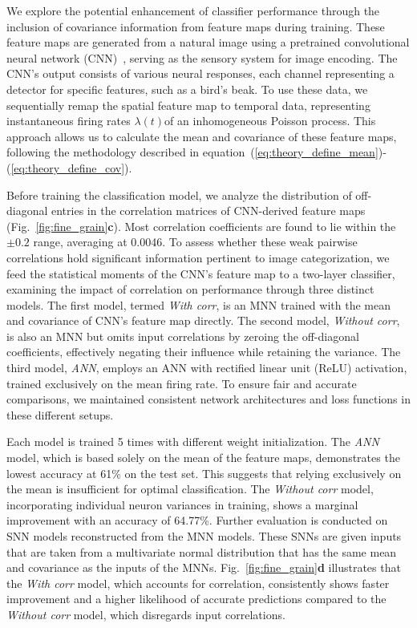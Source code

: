 We explore the potential enhancement of classifier performance through the inclusion of covariance information from feature maps during training. 
These feature maps are generated from a natural image using a pretrained convolutional neural network (CNN)~\cite{simonyan2014very}, serving as the sensory system for image encoding. 
The CNN's output consists of various neural responses, each channel representing a detector for specific features, such as a bird's beak. 
To use these data, we sequentially remap the spatial feature map to temporal data, representing instantaneous firing rates \(\lambda(t)\)of an inhomogeneous Poisson process. 
This approach allows us to calculate the mean and covariance of these feature maps, following the methodology described in equation~(\ref{eq:theory_define_mean})-(\ref{eq:theory_define_cov}). 

Before training the classification model, we analyze the distribution of off-diagonal entries in the correlation matrices of CNN-derived feature maps (Fig.~\ref{fig:fine_grain}\textbf{c}). 
Most correlation coefficients are found to lie within the \(\pm 0.2\) range, averaging at 0.0046. 
To assess whether these weak pairwise correlations hold significant information pertinent to image categorization, we feed the statistical moments of the CNN's feature map to a two-layer classifier, examining the impact of correlation on performance through three distinct models. 
The first model, termed \textit{With corr}, is an MNN trained with the mean and covariance of CNN's feature map directly.
The second model, \textit{Without corr}, is also an MNN but omits input correlations by zeroing the off-diagonal coefficients, effectively negating their influence while retaining the variance. 
The third model, \textit{ANN}, employs an ANN with rectified linear unit (ReLU) activation, trained exclusively on the mean firing rate.
To ensure fair and accurate comparisons, we maintained consistent network architectures and loss functions in these different setups.

Each model is trained 5 times with different weight initialization.
The \textit{ANN} model, which is based solely on the mean of the feature maps, demonstrates the lowest accuracy at 61\% on the test set. 
This suggests that relying exclusively on the mean is insufficient for optimal classification. 
The \textit{Without corr} model, incorporating individual neuron variances in training, shows a marginal improvement with an accuracy of 64.77\%. 
Further evaluation is conducted on SNN models reconstructed from the MNN models. 
These SNNs are given inputs that are taken from a multivariate normal distribution that has the same mean and covariance as the inputs of the MNNs.
Fig.~\ref{fig:fine_grain}\textbf{d} illustrates that the \textit{With corr} model, which accounts for correlation, consistently shows faster improvement and a higher likelihood of accurate predictions compared to the \textit{Without corr} model, which disregards input correlations.

